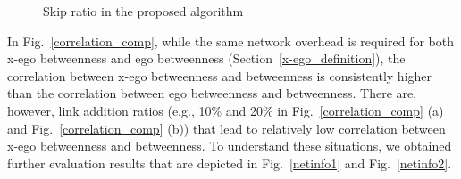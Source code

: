 \begin{figure}[t]
\centering
{}
\caption{Skip ratio in the proposed algorithm}
\label{skip}
\end{figure}
 
In Fig.~\ref{correlation_comp}, while the same network overhead is required for both x-ego betweenness and ego betweenness (Section~\ref{x-ego_definition}), the correlation between x-ego betweenness and betweenness is consistently higher than the correlation between ego betweenness and betweenness. 
There are, however, link addition ratios (e.g., 10\% and 20\% in Fig.~\ref{correlation_comp} (a) and Fig.~\ref{correlation_comp} (b)) that lead to relatively low correlation between x-ego betweenness and betweenness.
To understand these situations, we obtained further evaluation results that are depicted in Fig.~\ref{netinfo1} and Fig.~\ref{netinfo2}. 

